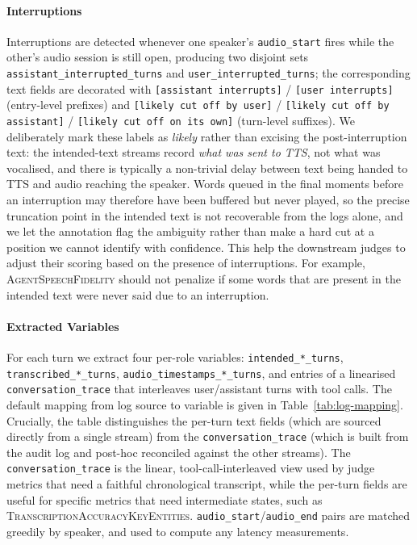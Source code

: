 \paragraph{Interruptions} Interruptions are detected whenever one speaker's \texttt{audio\_start} fires while the other's audio session is still open, producing two disjoint sets \texttt{assistant\_interrupted\_turns} and \texttt{user\_interrupted\_turns}; the corresponding text fields are decorated with \texttt{[assistant interrupts]} / \texttt{[user interrupts]} (entry-level prefixes) and \texttt{[likely cut off by user]} / \texttt{[likely cut off by assistant]} / \texttt{[likely cut off on its own]} (turn-level suffixes). We deliberately mark these labels as \emph{likely} rather than excising the post-interruption text: the intended-text streams record \emph{what was sent to TTS}, not what was vocalised, and there is typically a non-trivial delay between text being handed to TTS and audio reaching the speaker. Words queued in the final moments before an interruption may therefore have been buffered but never played, so the precise truncation point in the intended text is not recoverable from the logs alone, and we let the annotation flag the ambiguity rather than make a hard cut at a position we cannot identify with confidence. This help the downstream judges to adjust their scoring based on the presence of interruptions. For example, \textsc{AgentSpeechFidelity} should not penalize if some words that are present in the intended text were never said due to an interruption.

\paragraph{Extracted Variables} For each turn we extract four per-role variables:  \texttt{intended\_*\_turns}, \texttt{transcribed\_*\_turns}, \texttt{audio\_timestamps\_*\_turns}, and entries of a linearised \texttt{conversation\_trace} that interleaves user/assistant turns with tool calls. The default mapping from log source to variable is given in Table~\ref{tab:log-mapping}. Crucially, the table distinguishes the per-turn text fields (which are sourced directly from a single stream) from the \texttt{conversation\_trace} (which is built from the audit log and post-hoc reconciled against the other streams). The \texttt{conversation\_trace} is the linear, tool-call-interleaved view used by judge metrics that need a faithful chronological transcript, while the per-turn fields are useful for specific metrics that need intermediate states, such as  \textsc{TranscriptionAccuracyKeyEntities}. \texttt{audio\_start}/\texttt{audio\_end} pairs are matched greedily by speaker, and used to compute any latency measurements.

